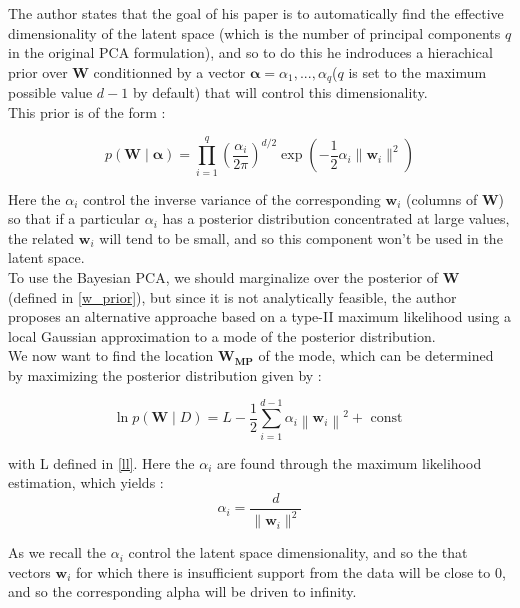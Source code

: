 \documentclass{article}
\begin{document}
The author states that the goal of his paper is to automatically find the effective dimensionality of the latent space (which is the number of principal components $q$ in the original PCA formulation), and so to do this he indroduces a hierachical prior over $\mathbf{W}$ conditionned by a vector $\mathbf{\alpha} = {\alpha_1,...,\alpha_q}$($q$ is set to the maximum possible value $d-1$ by default) that will control this dimensionality.\\
This prior is of the form : 

\begin{equation}
    p(\mathbf{W} \mid \mathbf{\alpha}) = \prod_{i=1}^q (\frac{\alpha_i}{2 \pi})^{d/2} \exp(-\frac{1}{2} \alpha_i \| \mathbf{w}_i\|^2)
    \label{w_prior}
\end{equation}

Here the $\alpha_i$ control the inverse variance of the corresponding $\mathbf{w}_i$ (columns of $\mathbf{W}$) so that if a particular $\alpha_i$ has a posterior distribution concentrated at large values, the related $\mathbf{w}_i$  will tend to be small, and so this component won't be used in the latent space.\\


To use the Bayesian PCA, we should marginalize over the posterior of $\mathbf{W}$ (defined in \ref{w_prior}), but since it is not analytically feasible, the author proposes an alternative approache based on a type-II maximum likelihood using a local Gaussian approximation to a mode of the posterior distribution. \\
We now want to find the location $\mathbf{W_{\text{MP}}}$ of the mode, which can be determined by maximizing the posterior distribution given by :

\begin{equation}
    \ln p(\mathbf{W} \mid D)=L-\frac{1}{2} \sum_{i=1}^{d-1} \alpha_{i}\left\|\mathbf{w}_{i}\right\|^{2}+\text { const }
\end{equation}

with L defined in \ref{ll}. Here the $\alpha_i$ are found through the maximum likelihood estimation, which yields : 
\begin{equation}
    \alpha_i = \frac{d}{\|\mathbf{w}_i\|^2}
    \label{alpha}
\end{equation}

As we recall the $\alpha_i$ control the latent space dimensionality, and so the that vectors $\mathbf{w}_i$ for which there is  insufficient support from the data will be close to 0, and so the corresponding alpha will be driven to infinity.\\
\end{document}
